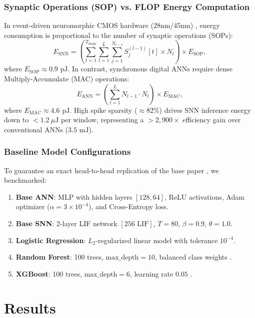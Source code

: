 \documentclass[pdflatex,sn-mathphys-num]{sn-jnl}
\begin{document}
\subsubsection{Synaptic Operations (SOP) vs. FLOP Energy Computation}
In event-driven neuromorphic CMOS hardware (28nm/45nm) \cite{davies2018loihi}, energy consumption is proportional to the number of synaptic operations (SOPs):
\begin{equation}
E_{\text{SNN}} = \left( \sum_{t=1}^{T_{\text{steps}}} \sum_{l=1}^L \sum_{j=1}^{N_{l-1}} S_j^{(l-1)}[t] \times N_l \right) \times E_{\text{SOP}},
\label{eq:sop_energy}
\end{equation}
where $E_{\text{SOP}} \approx 0.9\text{ pJ}$. In contrast, synchronous digital ANNs require dense Multiply-Accumulate (MAC) operations:
\begin{equation}
E_{\text{ANN}} = \left( \sum_{l=1}^L N_{l-1} \cdot N_l \right) \times E_{\text{MAC}},
\label{eq:mac_energy}
\end{equation}
where $E_{\text{MAC}} \approx 4.6\text{ pJ}$. High spike sparsity ($\approx 82\%$) drives SNN inference energy down to $< 1.2\ \mu\text{J}$ per window, representing a $> 2,900\times$ efficiency gain over conventional ANNs ($3.5\text{ mJ}$).

\subsubsection{Baseline Model Configurations}
To guarantee an exact head-to-head replication of the base paper \cite{jebaraj2026}, we benchmarked:
\begin{enumerate}
    \item \textbf{Base ANN}: MLP with hidden layers $[128, 64]$, ReLU activations, Adam optimizer ($\alpha = 3 \times 10^{-4}$), and Cross-Entropy loss.
    \item \textbf{Base SNN}: 2-layer LIF network $[256\text{ LIF}]$, $T=80$, $\beta=0.9$, $\theta=1.0$.
    \item \textbf{Logistic Regression}: $L_2$-regularized linear model with tolerance $10^{-4}$.
    \item \textbf{Random Forest}: 100 trees, $\text{max\_depth} = 10$, balanced class weights \cite{breiman2001random}.
    \item \textbf{XGBoost}: 100 trees, $\text{max\_depth} = 6$, learning rate $0.05$ \cite{chen2016xgboost}.
\end{enumerate}

\section{Results}\label{sec:results}
\end{document}
